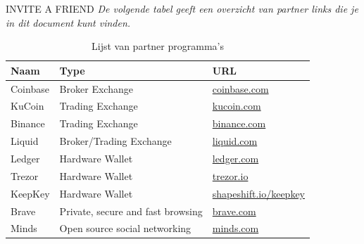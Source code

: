 \begin{cryptobox}{INVITE A FRIEND}
\textit{De volgende tabel geeft een overzicht van partner links die je in dit document kunt vinden.}

\begin{table}[H]
\centering
\caption{Lijst van partner programma's}
\begin{tabular}{lll} 
\toprule

\textbf{Naam} & \textbf{Type }  & \textbf{URL}\\
\midrule

Coinbase & Broker Exchange & \href{https://www.coinbase.com/join/51954a2b26a1bcc484000015}{coinbase.com} \\
KuCoin   &  Trading Exchange & \href{https://www.kucoin.com/#/?r=aNuPeb}{kucoin.com} \\
Binance  &  Trading Exchange& \href{https://www.binance.com/?ref=35602166}{binance.com} \\
Liquid   &  Broker/Trading Exchange & \href{https://www.liquid.com?affiliate=nUfQhVL4164547}{liquid.com} \\
Ledger & Hardware Wallet & \href{https://shop.ledger.com/pages/ledger-nano-x?r=1849e3ffabd0}{ledger.com} \\
Trezor & Hardware Wallet &\href{https://shop.trezor.io/?offer_id=10&aff_id=3118&source=cryptomanual}{trezor.io} \\
KeepKey & Hardware Wallet &\href{https://shapeshift.io/keepkey/}{shapeshift.io/keepkey} \\
Brave & Private, secure and fast browsing & \href{https://brave.com/urm569}{brave.com} \\
Minds & Open source social networking & \href{https://www.minds.com/register?referrer=cryptomanuals}{minds.com} \\

\end{tabular}
\label{tab:exchange_affiliates}
\end{table}

\end{cryptobox}